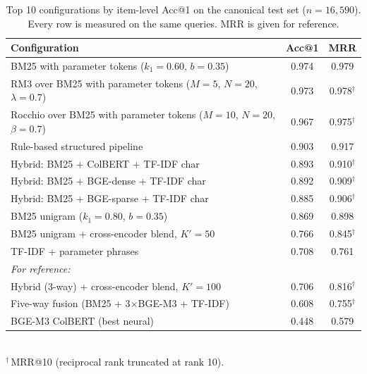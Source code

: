 \begin{table}[htbp]
\centering
\caption{Top 10 configurations by item-level Acc@1 on the canonical test set ($n=16{,}590$). Every row is measured on the same queries. MRR is given for reference.}
\label{tab:overall_performance}
\begin{tabular}{lcc}
\toprule
\textbf{Configuration} & \textbf{Acc@1} & \textbf{MRR} \\
\midrule
BM25 with parameter tokens ($k_1{=}0.60$, $b{=}0.35$) & 0.974 & 0.979 \\
RM3 over BM25 with parameter tokens ($M{=}5$, $N{=}20$, $\lambda{=}0.7$) & 0.973 & 0.978$^{\dagger}$ \\
Rocchio over BM25 with parameter tokens ($M{=}10$, $N{=}20$, $\beta{=}0.7$) & 0.967 & 0.975$^{\dagger}$ \\
Rule-based structured pipeline & 0.903 & 0.917 \\
Hybrid: BM25 + ColBERT + TF-IDF char & 0.893 & 0.910$^{\dagger}$ \\
Hybrid: BM25 + BGE-dense + TF-IDF char & 0.892 & 0.909$^{\dagger}$ \\
Hybrid: BM25 + BGE-sparse + TF-IDF char & 0.885 & 0.906$^{\dagger}$ \\
BM25 unigram ($k_1{=}0.80$, $b{=}0.35$) & 0.869 & 0.898 \\
BM25 unigram + cross-encoder blend, $K'{=}50$ & 0.766 & 0.845$^{\dagger}$ \\
TF-IDF + parameter phrases & 0.708 & 0.761 \\
\midrule
\multicolumn{3}{l}{\textit{For reference:}} \\
Hybrid (3-way) + cross-encoder blend, $K'{=}100$ & 0.706 & 0.816$^{\dagger}$ \\
Five-way fusion (BM25 + 3$\times$BGE-M3 + TF-IDF) & 0.608 & 0.755$^{\dagger}$ \\
BGE-M3 ColBERT (best neural) & 0.448 & 0.579 \\
\bottomrule
\end{tabular}
\\[2pt]{\footnotesize $^{\dagger}$\,MRR@10 (reciprocal rank truncated at rank 10).}
\end{table}
